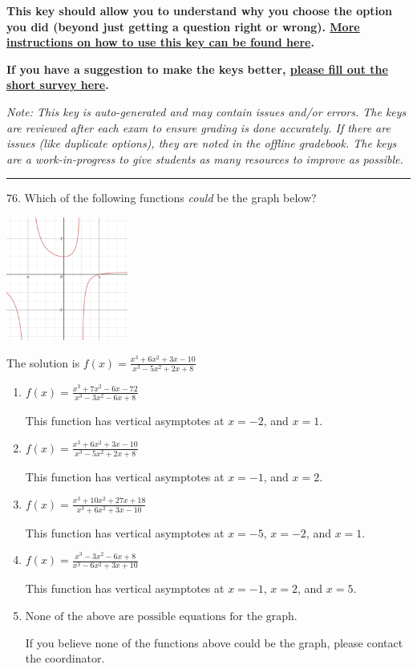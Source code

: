 \documentclass{extbook}[14pt]
\begin{document}
\textbf{This key should allow you to understand why you choose the option you did (beyond just getting a question right or wrong). \href{https://xronos.clas.ufl.edu/mac1105spring2020/courseDescriptionAndMisc/Exams/LearningFromResults}{More instructions on how to use this key can be found here}.}

\textbf{If you have a suggestion to make the keys better, \href{https://forms.gle/CZkbZmPbC9XALEE88}{please fill out the short survey here}.}

\textit{Note: This key is auto-generated and may contain issues and/or errors. The keys are reviewed after each exam to ensure grading is done accurately. If there are issues (like duplicate options), they are noted in the offline gradebook. The keys are a work-in-progress to give students as many resources to improve as possible.}

\rule{\textwidth}{0.4pt}

76. Which of the following functions \textit{could} be the graph below?
\begin{center} \includegraphics[width=0.3\textwidth]{../Figures/identifyGraphOfRationalFunctionB.png} \end{center} 

The solution is $ f(x) = \frac{x^{3} +6 x^{2} +3 x -10}{x^{3} -5 x^{2} +2 x + 8} $ 

\begin{enumerate}[label=\Alph*.] 
\item $ f(x) = \frac{x^{3} +7 x^{2} -6 x -72}{x^{3} -3 x^{2} -6 x + 8} $ 

 This function has vertical asymptotes at $x=-2$, and $x=1$. 
\item $ f(x) = \frac{x^{3} +6 x^{2} +3 x -10}{x^{3} -5 x^{2} +2 x + 8} $ 

 This function has vertical asymptotes at $x=-1$, and $x=2$. 
\item $ f(x) = \frac{x^{3} +10 x^{2} +27 x + 18}{x^{3} +6 x^{2} +3 x -10} $ 

 This function has vertical asymptotes at $x=-5$, $x=-2$, and $x=1$. 
\item $ f(x) = \frac{x^{3} -3 x^{2} -6 x + 8}{x^{3} -6 x^{2} +3 x + 10} $ 

 This function has vertical asymptotes at $x=-1$, $x=2$, and $x=5$. 
\item $ \text{None of the above are possible equations for the graph.} $ 

 If you believe none of the functions above could be the graph, please contact the coordinator. 
\end{enumerate} 
 
\end{document}
